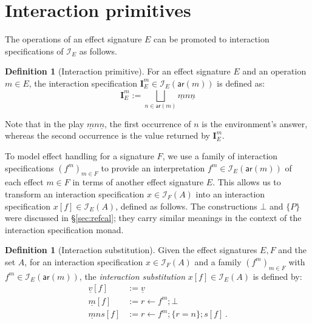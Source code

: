 \documentclass[draft,11pt]{report}
\theoremstyle{definition}
\newtheorem{definition}[theorem]{Definition}
\newcommand{\kw}[1]{\ensuremath{ \mathsf{#1} }}
\begin{document}

\section{Interaction primitives} %

The operations of an effect signature $E$
can be promoted to interaction specifications of $\mathcal{I}_E$
as follows.

\begin{definition}[Interaction primitive]
For an effect signature $E$ and
an operation $m \in E$,
the interaction specification
$\mathbf{I}_E^m \in \mathcal{I}_E(\kw{ar}(m))$
is defined as:
\[
  \mathbf{I}_E^m :=
    \bigsqcup_{n \in \kw{ar}(m)} \underline{m} n \underline{n}
\]
\end{definition}
Note that in the play $\underline{m} n \underline{n}$,
the first occurrence of $n$ is the environment's answer,
whereas the second occurrence is the value returned by $\mathbf{I}_E^m$.

To model effect handling for a signature $F$,
we use a family of interaction specifications
$(f^m)_{m \in F}$
to provide an interpretation $f^m \in \mathcal{I}_E(\kw{ar}(m))$
of each effect $m \in F$
in terms of another effect signature $E$.
This allows us to transform an interaction specification
$x \in \mathcal{I}_F(A)$
into an interaction specification
$x[f] \in \mathcal{I}_E(A)$,
defined as follows.
The constructions $\bot$ and $\{P\}$ were discussed in \S\ref{sec:refcal};
they carry similar meanings in the context of the
interaction specification monad.

\begin{definition}[Interaction substitution]
Given the effect signatures $E, F$ and the set $A$,
for an interaction specification $x \in \mathcal{I}_F(A)$
and a family $(f^m)_{m \in F}$ with $f^m \in \mathcal{I}_E(\kw{ar}(m))$,
the \emph{interaction substitution} $x[f] \in \mathcal{I}_E(A)$
is defined by:
\begin{align*}
  \underline{v}[f] &:= \underline{v} \\
  \underline{m}[f] &:= r \leftarrow f^m ; \bot \\
  \underline{m}ns[f] &:= r \leftarrow f^m ; \{r = n\} ; s[f] \,.
\end{align*}
\end{definition}

\end{document}
